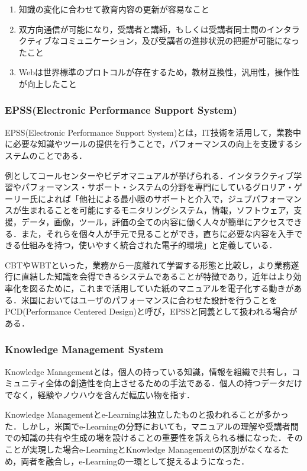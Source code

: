 \documentclass[a4j,12pt]{jsarticle}
\begin{document}
\begin{enumerate}
\item 知識の変化に合わせて教育内容の更新が容易なこと
\item 双方向通信が可能になり，受講者と講師，もしくは受講者同士間のインタラクティブなコミュニケーション，及び受講者の進捗状況の把握が可能になったこと
\item Webは世界標準のプロトコルが存在するため，教材互換性，汎用性，操作性が向上したこと
\end{enumerate}

\subsubsection{EPSS(Electronic Performance Support System)}
EPSS(Electronic Performance Support System)とは，IT技術を活用して，業務中に必要な知識やツールの提供を行うことで，パフォーマンスの向上を支援するシステムのことである．

例としてコールセンターやビデオマニュアルが挙げられる．インタラクティブ学習やパフォーマンス・サポート・システムの分野を専門にしているグロリア・ゲーリー氏によれば「他社による最小限のサポートと介入で，ジュブパフォーマンスが生まれることを可能にするモニタリングシステム，情報，ソフトウェア，支援，データ，画像，ツール，評価の全ての内容に働く人々が簡単にアクセスできる．また，それらを個々人が手元で見ることができ，直ちに必要な内容を入手できる仕組みを持つ，使いやすく統合された電子的環境」と定義している．

CBTやWBTといった，業務から一度離れて学習する形態と比較し，より業務遂行に直結した知識を会得できるシステムであることが特徴であり，近年はより効率化を図るために，これまで活用していた紙のマニュアルを電子化する動きがある．米国においてはユーザのパフォーマンスに合わせた設計を行うことをPCD(Performance Centered Design)と呼び，EPSSと同義として扱われる場合がある．
\subsubsection{Knowledge Management System}
Knowledge Managementとは，個人の持っている知識，情報を組織で共有し，コミュニティ全体の創造性を向上させるための手法である．個人の持つデータだけでなく，経験やノウハウを含んだ幅広い物を指す．

Knowledge Managementとe-Learningは独立したものと扱われることが多かった．しかし，米国でe-Learningの分野においても，マニュアルの理解や受講者間での知識の共有や生成の場を設けることの重要性を訴えられる様になった．そのことが実現した場合e-LearningとKnowledge Managementの区別がなくなるため，両者を融合し，e-Learningの一環として捉えるようになった．
\end{document}
